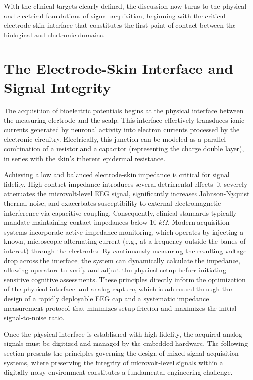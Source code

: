 With the clinical targets clearly defined, the discussion now turns to the physical and electrical foundations of signal acquisition, beginning with the critical electrode-skin interface that constitutes the first point of contact between the biological and electronic domains.

\section{The Electrode-Skin Interface and Signal Integrity}
\label{sec:electrode_skin}

The acquisition of bioelectric potentials begins at the physical interface between the measuring electrode and the scalp. This interface effectively transduces ionic currents generated by neuronal activity into electron currents processed by the electronic circuitry. Electrically, this junction can be modeled as a parallel combination of a resistor and a capacitor (representing the charge double layer), in series with the skin's inherent epidermal resistance.

Achieving a low and balanced electrode-skin impedance is critical for signal fidelity. High contact impedance introduces several detrimental effects: it severely attenuates the microvolt-level EEG signal, significantly increases Johnson-Nyquist thermal noise, and exacerbates susceptibility to external electromagnetic interference via capacitive coupling. Consequently, clinical standards typically mandate maintaining contact impedances below 10 $k\Omega$. Modern acquisition systems incorporate active impedance monitoring, which operates by injecting a known, microscopic alternating current (e.g., at a frequency outside the bands of interest) through the electrodes. By continuously measuring the resulting voltage drop across the interface, the system can dynamically calculate the impedance, allowing operators to verify and adjust the physical setup before initiating sensitive cognitive assessments. These principles directly inform the optimization of the physical interface and analog capture, which is addressed through the design of a rapidly deployable EEG cap and a systematic impedance measurement protocol that minimizes setup friction and maximizes the initial signal-to-noise ratio.

Once the physical interface is established with high fidelity, the acquired analog signals must be digitized and managed by the embedded hardware. The following section presents the principles governing the design of mixed-signal acquisition systems, where preserving the integrity of microvolt-level signals within a digitally noisy environment constitutes a fundamental engineering challenge.

